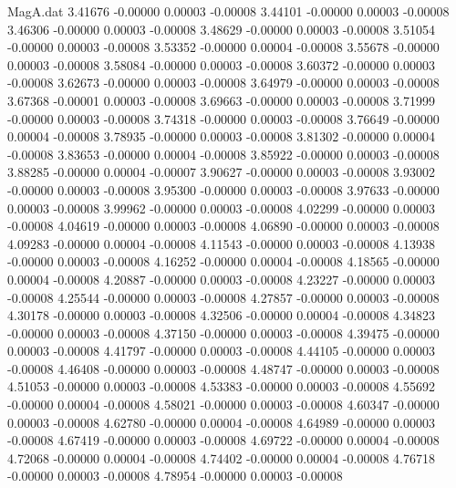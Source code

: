 \begin{filecontents}{MagA.dat}
   3.41676   -0.00000    0.00003   -0.00008
   3.44101   -0.00000    0.00003   -0.00008
   3.46306   -0.00000    0.00003   -0.00008
   3.48629   -0.00000    0.00003   -0.00008
   3.51054   -0.00000    0.00003   -0.00008
   3.53352   -0.00000    0.00004   -0.00008
   3.55678   -0.00000    0.00003   -0.00008
   3.58084   -0.00000    0.00003   -0.00008
   3.60372   -0.00000    0.00003   -0.00008
   3.62673   -0.00000    0.00003   -0.00008
   3.64979   -0.00000    0.00003   -0.00008
   3.67368   -0.00001    0.00003   -0.00008
   3.69663   -0.00000    0.00003   -0.00008
   3.71999   -0.00000    0.00003   -0.00008
   3.74318   -0.00000    0.00003   -0.00008
   3.76649   -0.00000    0.00004   -0.00008
   3.78935   -0.00000    0.00003   -0.00008
   3.81302   -0.00000    0.00004   -0.00008
   3.83653   -0.00000    0.00004   -0.00008
   3.85922   -0.00000    0.00003   -0.00008
   3.88285   -0.00000    0.00004   -0.00007
   3.90627   -0.00000    0.00003   -0.00008
   3.93002   -0.00000    0.00003   -0.00008
   3.95300   -0.00000    0.00003   -0.00008
   3.97633   -0.00000    0.00003   -0.00008
   3.99962   -0.00000    0.00003   -0.00008
   4.02299   -0.00000    0.00003   -0.00008
   4.04619   -0.00000    0.00003   -0.00008
   4.06890   -0.00000    0.00003   -0.00008
   4.09283   -0.00000    0.00004   -0.00008
   4.11543   -0.00000    0.00003   -0.00008
   4.13938   -0.00000    0.00003   -0.00008
   4.16252   -0.00000    0.00004   -0.00008
   4.18565   -0.00000    0.00004   -0.00008
   4.20887   -0.00000    0.00003   -0.00008
   4.23227   -0.00000    0.00003   -0.00008
   4.25544   -0.00000    0.00003   -0.00008
   4.27857   -0.00000    0.00003   -0.00008
   4.30178   -0.00000    0.00003   -0.00008
   4.32506   -0.00000    0.00004   -0.00008
   4.34823   -0.00000    0.00003   -0.00008
   4.37150   -0.00000    0.00003   -0.00008
   4.39475   -0.00000    0.00003   -0.00008
   4.41797   -0.00000    0.00003   -0.00008
   4.44105   -0.00000    0.00003   -0.00008
   4.46408   -0.00000    0.00003   -0.00008
   4.48747   -0.00000    0.00003   -0.00008
   4.51053   -0.00000    0.00003   -0.00008
   4.53383   -0.00000    0.00003   -0.00008
   4.55692   -0.00000    0.00004   -0.00008
   4.58021   -0.00000    0.00003   -0.00008
   4.60347   -0.00000    0.00003   -0.00008
   4.62780   -0.00000    0.00004   -0.00008
   4.64989   -0.00000    0.00003   -0.00008
   4.67419   -0.00000    0.00003   -0.00008
   4.69722   -0.00000    0.00004   -0.00008
   4.72068   -0.00000    0.00004   -0.00008
   4.74402   -0.00000    0.00004   -0.00008
   4.76718   -0.00000    0.00003   -0.00008
   4.78954   -0.00000    0.00003   -0.00008

\end{filecontents}
